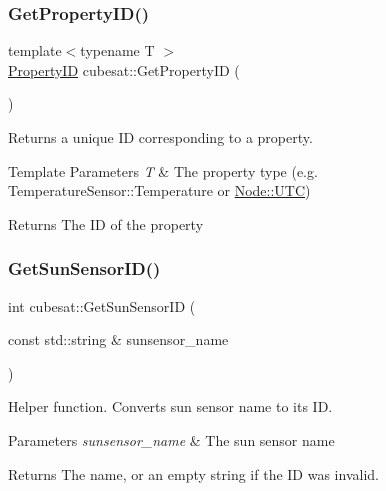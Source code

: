 \mbox{\label{namespacecubesat_a705e2168749172dcbae8a042595376f9}} 
\subsubsection{\texorpdfstring{Get\+Property\+I\+D()}{GetPropertyID()}}
{\footnotesize\ttfamily template$<$typename T $>$ \\
\hyperlink{namespacecubesat_ab5c769503b8a77bc90a47ca8705f2f86}{Property\+ID} cubesat\+::\+Get\+Property\+ID (\begin{DoxyParamCaption}{ }\end{DoxyParamCaption})}



Returns a unique ID corresponding to a property. 


\begin{DoxyTemplParams}{Template Parameters}
{\em T} & The property type (e.\+g. Temperature\+Sensor\+::\+Temperature or \hyperlink{structcubesat_1_1Node_1_1UTC}{Node\+::\+U\+TC}) \\
\hline
\end{DoxyTemplParams}
\begin{DoxyReturn}{Returns}
The ID of the property 
\end{DoxyReturn}
\mbox{\label{namespacecubesat_a3d30cc7e0aa699067b162ab714873f97}} 
\subsubsection{\texorpdfstring{Get\+Sun\+Sensor\+I\+D()}{GetSunSensorID()}}
{\footnotesize\ttfamily int cubesat\+::\+Get\+Sun\+Sensor\+ID (\begin{DoxyParamCaption}\item[{const std\+::string \&}]{sunsensor\+\_\+name }\end{DoxyParamCaption})\hspace{0.3cm}{\ttfamily [inline]}}



Helper function. Converts sun sensor name to its ID. 


\begin{DoxyParams}{Parameters}
{\em sunsensor\+\_\+name} & The sun sensor name \\
\hline
\end{DoxyParams}
\begin{DoxyReturn}{Returns}
The name, or an empty string if the ID was invalid. 
\end{DoxyReturn}
\mbox{\label{namespacecubesat_af98c0f45932dc066e264459dd9aed5f2}} 
